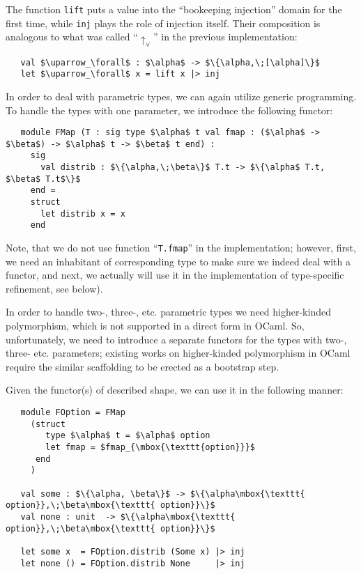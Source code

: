The function \lstinline{lift} puts a value into the ``bookeeping injection'' domain for the first time, while
\lstinline{inj} plays the role of injection itself. Their composition is analogous to what was 
called ``$\uparrow_\forall$'' in the previous implementation:

\begin{lstlisting}
   val $\uparrow_\forall$ : $\alpha$ -> $\{\alpha,\;[\alpha]\}$
   let $\uparrow_\forall$ x = lift x |> inj
\end{lstlisting}

In order to deal with parametric types, we can again utilize generic programming. To handle the types with
one parameter, we introduce the following functor:

\begin{lstlisting}
   module FMap (T : sig type $\alpha$ t val fmap : ($\alpha$ -> $\beta$) -> $\alpha$ t -> $\beta$ t end) :      
     sig 
       val distrib : $\{\alpha,\;\beta\}$ T.t -> $\{\alpha$ T.t, $\beta$ T.t$\}$ 
     end =
     struct
       let distrib x = x
     end
\end{lstlisting}

Note, that we do not use function ``\lstinline{T.fmap}'' in the implementation; however, first, we need an inhabitant of
corresponding type to make sure we indeed deal with a functor, and next, we actually will use it in the 
implementation of type-specific refinement, see below).

In order to handle two-, three-, etc. parametric types we need higher-kinded polymorphism, which is
not supported in a direct form in OCaml. So, unfortunately, we need to introduce a separate
functors for the types with two-, three- etc. parameters; existing works on higher-kinded
polymorphism in OCaml~\cite{HKinded} require the similar scaffolding to be erected as a bootstrap step.

Given the functor(s) of described shape, we can use it in the following manner:

\begin{lstlisting}
   module FOption = FMap 
     (struct 
        type $\alpha$ t = $\alpha$ option 
        let fmap = $fmap_{\mbox{\texttt{option}}}$ 
      end
     )

   val some : $\{\alpha, \beta\}$ -> $\{\alpha\mbox{\texttt{ option}},\;\beta\mbox{\texttt{ option}}\}$
   val none : unit  -> $\{\alpha\mbox{\texttt{ option}},\;\beta\mbox{\texttt{ option}}\}$
   
   let some x  = FOption.distrib (Some x) |> inj
   let none () = FOption.distrib None     |> inj
\end{lstlisting}

